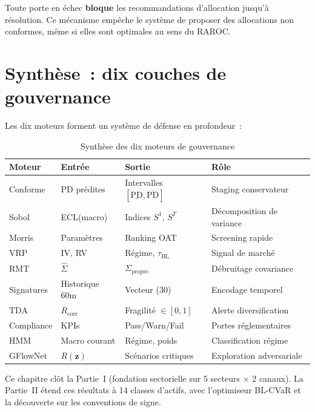 \documentclass[12pt, a4paper, twoside, openright]{report}
\theoremstyle{definition}
\begin{document}
Toute porte en échec \textbf{bloque} les recommandations d'allocation jusqu'à résolution. Ce mécanisme empêche le système de proposer des allocations non conformes, même si elles sont optimales au sens du RAROC.

\section{Synthèse~: dix couches de gouvernance}
\label{sec:gouv:synthese}

Les dix moteurs forment un système de défense en profondeur~:

\begin{table}[htbp]
\centering
\caption{Synthèse des dix moteurs de gouvernance}
\label{tab:gouvernance-synthese}
\small
\begin{tabular}{llll}
\toprule
Moteur & Entrée & Sortie & Rôle \\
\midrule
Conforme & PD prédites & Intervalles $[\underline{\text{PD}}, \overline{\text{PD}}]$ & Staging conservateur \\
Sobol & ECL(macro) & Indices $S^1$, $S^T$ & Décomposition de variance \\
Morris & Paramètres & Ranking OAT & Screening rapide \\
VRP & IV, RV & Régime, $\tau_{\text{BL}}$ & Signal de marché \\
RMT & $\hat{\Sigma}$ & $\Sigma_{\text{propre}}$ & Débruitage covariance \\
Signatures & Historique 60m & Vecteur (30) & Encodage temporel \\
TDA & $R_{\text{corr}}$ & Fragilité $\in [0,1]$ & Alerte diversification \\
Compliance & KPIs & Pass/Warn/Fail & Portes réglementaires \\
HMM & Macro courant & Régime, poids & Classification régime \\
GFlowNet & $R(\mathbf{z})$ & Scénarios critiques & Exploration adversariale \\
\bottomrule
\end{tabular}
\end{table}

Ce chapitre clôt la Partie~I (fondation sectorielle sur 5 secteurs $\times$ 2 canaux). La Partie~II étend ces résultats à 14 classes d'actifs, avec l'optimiseur BL-CVaR et la découverte sur les conventions de signe.


\end{document}
